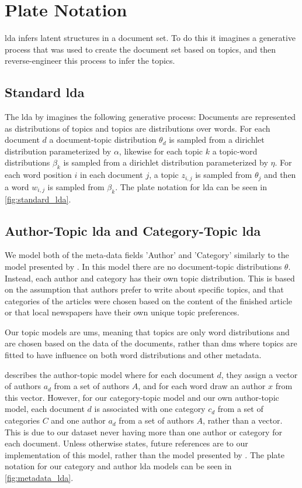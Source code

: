 \section{Plate Notation}
\Gls{lda} infers latent structures in a document set. To do this it imagines a generative process that was used to create the document set based on topics, and then reverse-engineer this process to infer the topics.

\subsection{Standard \gls{lda}}
The \gls{lda} by \citet{blei2003latent} imagines the following generative process:
Documents are represented as distributions of topics and topics are distributions over words.
For each document $d$ a document-topic distribution $\theta_d$ is sampled from a dirichlet distribution parameterized by $\alpha$, likewise for each topic $k$ a topic-word distributions $\beta_k$ is sampled from a dirichlet distribution parameterized by $\eta$.
For each word position $i$ in each document $j$, a topic $z_{i,j}$ is sampled from $\theta_j$ and then a word $w_{i,j}$ is sampled from $\beta_k$.
The plate notation for \gls{lda} can be seen in \autoref{fig:standard_lda}.



\subsection{Author-Topic \gls{lda} and Category-Topic \gls{lda}}
We model both of the meta-data fields 'Author' and 'Category' similarly to the model presented by \citet{author_topic_2012}.
In this model there are no document-topic distributions $\theta$.
Instead, each author and category has their own topic distribution.
This is based on the assumption that authors prefer to write about specific topics, and that categories of the articles were chosen based on the content of the finished article or that local newspapers have their own unique topic preferences.

Our topic models are \glspl{um}, meaning that topics are only word distributions and are chosen based on the data of the documents, rather than \glspl{dm} where topics are fitted to have influence on both word distributions and other metadata.

\citet{author_topic_2012} describes the author-topic model where for each document $d$, they assign a vector of authors $a_d$ from a set of authors $A$, and for each word draw an author $x$ from this vector.
However, for our category-topic model and our own author-topic model, each document $d$ is associated with one category $c_d$ from a set of categories $C$ and one author $a_d$ from a set of authors $A$, rather than a vector.
This is due to our dataset never having more than one author or category for each document.
Unless otherwise states, future references are to our implementation of this model, rather than the model presented by \citet{author_topic_2012}.
The plate notation for our category and author \gls{lda} models can be seen in \autoref{fig:metadata_lda}.

